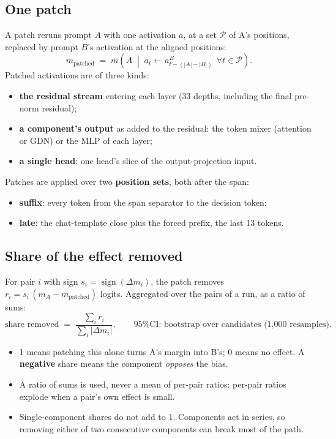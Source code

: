 \documentclass[11pt,a4paper]{article}
\newcommand{\dm}{\Delta m}
\begin{document}
\subsection{One patch}
A patch reruns prompt $A$ with one activation $a$, at a set $\mathcal P$ of A's positions, replaced
by prompt $B$'s activation at the aligned positions:
\begin{equation}
  m_{\text{patched}} \;=\; m\!\left(A \;\middle|\; a_t \leftarrow a^{B}_{t-(|A|-|B|)}\ \ \forall t\in\mathcal P\right).
\end{equation}
Patched activations are of three kinds:
\begin{itemize}
  \item \textbf{the residual stream} entering each layer (33 depths, including the final pre-norm
        residual);
  \item \textbf{a component's output} as added to the residual: the token mixer (attention or GDN)
        or the MLP of each layer;
  \item \textbf{a single head}: one head's slice of the output-projection input.
\end{itemize}
Patches are applied over two \textbf{position sets}, both after the span:
\begin{itemize}
  \item \textbf{suffix}: every token from the span separator to the decision token;
  \item \textbf{late}: the chat-template close plus the forced prefix, the last 13 tokens.
\end{itemize}

\subsection{Share of the effect removed}
For pair $i$ with sign $s_i=\operatorname{sign}(\dm_i)$, the patch removes $r_i = s_i\,(m_A -
m_{\text{patched}})$ logits. Aggregated over the pairs of a run, as a ratio of sums:
\begin{equation}
  \text{share removed} \;=\; \frac{\sum_i r_i}{\sum_i |\dm_i|},
  \qquad
  \text{95\% CI: bootstrap over candidates (1{,}000 resamples).}
\end{equation}
\begin{itemize}
  \item 1 means patching this alone turns A's margin into B's; 0 means no effect. A
        \textbf{negative} share means the component \emph{opposes} the bias.
  \item A ratio of sums is used, never a mean of per-pair ratios: per-pair ratios explode when a
        pair's own effect is small.
  \item Single-component shares do not add to 1. Components act in series, so removing either of
        two consecutive components can break most of the path.
\end{itemize}
\end{document}
